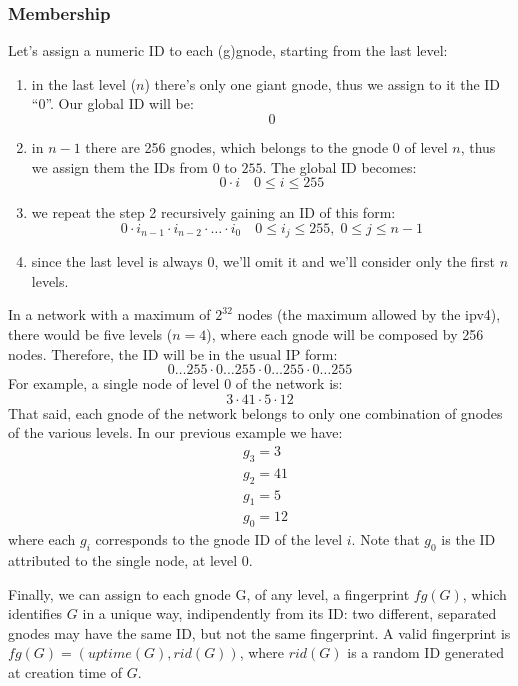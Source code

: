 \documentclass[a4paper]{article}
\begin{document}
\subsubsection{Membership}
Let's assign a numeric ID to each (g)gnode, starting from the last level:
\begin{enumerate}
	\item in the last level ($n$) there's only one giant gnode, thus we assign
		to it the ID ``0''. Our global ID will be:
		\[
		0
		\]
	\item in $n-1$ there are 256 gnodes, which belongs to the gnode 0 of
		level $n$, thus we assign them the IDs from $0$ to $255$.
		The global ID becomes:
		\[
		0\cdot i\quad 0\le  i\le 255
		\]
	\item we repeat the step 2 recursively gaining an ID of this form:
		\[
		0\cdot i_{n-1}\cdot i_{n-2}\cdot \dots \cdot i_0 \quad 0\le i_j\le 255,\;0\le j\le n-1
		\]
	\item since the last level is always $0$, we'll omit it and we'll
		consider only the first $n$ levels.
\end{enumerate}
In a network with a maximum of $2^{32}$ nodes (the maximum allowed by the ipv4),
there would be five levels ($n=4$), where each gnode will be composed by 256 nodes.
Therefore, the ID will be in the usual IP form:
\[
0\dots255\cdot 0\dots255\cdot 0\dots255\cdot 0\dots255
\]
For example, a single node of level 0 of the network is:
\[
3\cdot 41\cdot 5\cdot 12
\]
That said, each gnode of the network belongs to only one combination of gnodes
of the various levels. In our previous example we have:
\begin{align*}
	&g_3=3\\
	&g_2=41\\
	&g_1=5\\
	&g_0=12
\end{align*}
where each $g_i$ corresponds to the gnode ID of the level $i$. Note that $g_0$
is the ID attributed to the single node, at level 0.

Finally, we can assign to each gnode G, of any level, a fingerprint $fg(G)$,
which identifies $G$ in a unique way, indipendently from its ID: two
different, separated gnodes may have the same ID, but not the same
fingerprint. A valid fingerprint is $fg(G)=(uptime(G), rid(G))$, where
$rid(G)$ is a random ID generated at creation time of $G$.
\end{document}
